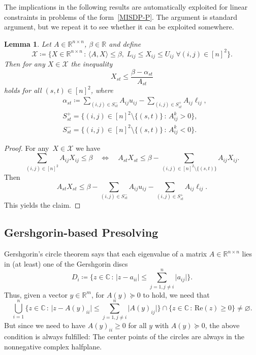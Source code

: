 \documentclass[10pt, a4paper]{article}
\renewcommand{\Re}{\text{Re}}
\newcommand{\suchthat}{\,:\,}
\newcommand{\abs}[1]{\lvert{#1}\rvert}
\newcommand{\define}{\coloneqq}
\newcommand{\skal}[2]{\langle{#1},{#2}\rangle}
\newcommand{\R}{\mathds{R}}
\newcommand{\C}{\mathds{C}}
\newtheorem{lemma}[theorem]{Lemma}
\begin{document}
The implications in the following results are automatically exploited for
linear constraints in problems of the form~\eqref{MISDP-P}. The argument
is standard argument, but we repeat it to see whether it can be exploited
somewhere.

\begin{lemma}
  Let $A \in \R^{n \times n}$, $\beta \in \R$ and define
  \[
    \mathcal{X} \define \{ X \in \R^{n\times n} \suchthat \skal{A}{X} \leq
    \beta,\; L_{ij} \leq X_{ij} \leq U_{ij}\; \forall (i,j) \in [n]^2\}.
  \]
  Then for any $X \in \mathcal{X}$ the inequality
  \[
    X_{st} \leq \frac{\beta - \alpha_{st}}{A_{st}}
  \]
  holds for all $(s,t) \in [n]^2$, where
  \begin{align*}
    & \alpha_{st} \define \sum_{(i,j) \in S^-_{st}} A_{ij} u_{ij} - \sum_{(i,j) \in S^+_{st}} A_{ij} \ell_{ij},\\
    & S^+_{st} = \{(i,j) \in [n]^2 \setminus \{(s,t)\} \suchthat A^k_{ij} > 0\},\\
    & S^-_{st} = \{(i,j) \in [n]^2 \setminus \{(s,t)\} \suchthat A^k_{ij} < 0\}.
  \end{align*}
\end{lemma}

\begin{proof}
  For any~$X \in \mathcal{X}$ we have
  \[
    \sum_{(i,j) \in [n]^2} A_{ij} X_{ij} \leq \beta
    \quad\Leftrightarrow\quad A_{st} X_{st} \leq \beta - \sum_{(i,j) \in [n]^2
      \setminus \{(s,t)\}} A_{ij} X_{ij}.
  \]
  Then
  \[
    A_{st} X_{st} \leq \beta - \sum_{(i,j) \in S^-_{st}} A_{ij} u_{ij} - \sum_{(i,j) \in S^+_{st}} A_{ij} \ell_{ij}.
  \]
  This yields the claim.
\end{proof}


\subsection{Gershgorin-based Presolving}

Gershgorin's circle theorem says that each eigenvalue of a matrix
$A \in \R^{n \times n}$ lies in (at least) one of the Gershgorin discs
\[
  D_i \define \Big\{z \in \C \suchthat \abs{z - a_{ii}} \leq \sum_{j=1, j \neq
    i}^n \abs{a_{ij}} \Big\}.
\]
Thus, given a vector $y \in \R^m$, for $A(y) \succeq 0$ to hold, we need
that
\[
  \bigcup_{i=1}^n \bigg\{z \in \C \suchthat \abs{z - A(y)_{ii}} \leq \sum_{j=1, j \neq
    i}^n \abs{A(y)_{ij}}\bigg\} \cap \{z \in \C \suchthat \Re(z) \geq 0\}
  \neq \varnothing.
\]
But since we need to have $A(y)_{ii} \geq 0$ for all $y$ with
$A(y) \succeq 0$, the above condition is always fulfilled: The center
points of the circles are always in the nonnegative complex halfplane.
\end{document}
